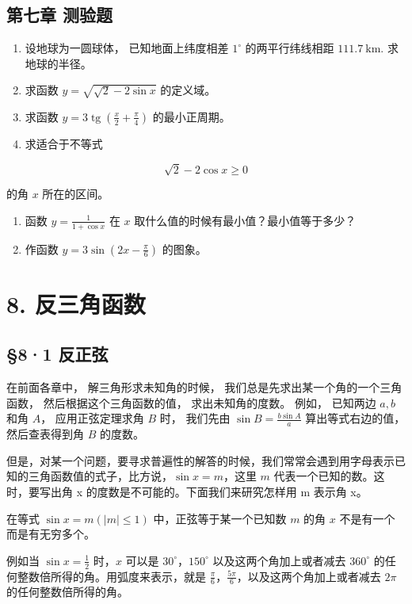 \section{第七章 测验题}

\begin{enumerate}
\item
  设地球为一圆球体， 已知地面上纬度相差 \(1^{\circ}\) 的两平行纬线相距
  \(111.7 \mathrm{~km}\). 求地球的半径。
\item
  求函数 \(y = \sqrt{\sqrt2-2\sin x}\) 的定义域。
\item
  求函数
  \(y = 3 \operatorname{tg} \left( \frac{x}{2} + \frac{\pi}{4} \right)\)
  的最小正周期。
\item
  求适合于不等式
\end{enumerate}

\[
\sqrt {2} - 2 \cos x \geqslant 0
\]

的角 \(x\) 所在的区间。

\begin{enumerate}[start=5]
\item
  函数 \(y = \frac{1}{1 + \cos x}\) 在 \(x\)
  取什么值的时候有最小值？最小值等于多少？
\item
  作函数 \(y = 3 \sin \left( 2x - \frac{\pi}{6} \right)\) 的图象。
\end{enumerate}

\chapter{8. 反三角函数}

\section{§8·1 反正弦}

在前面各章中， 解三角形求未知角的时候，
我们总是先求出某一个角的一个三角函数， 然后根据这个三角函数的值，
求出未知角的度数。 例如， 已知两边 \(a, b\) 和角 \(A\)，
应用正弦定理求角 \(B\) 时， 我们先由 \(\sin B = \frac{b \sin A}{a}\)
算出等式右边的值， 然后查表得到角 \(B\) 的度数。

但是，对某一个问题，要寻求普遍性的解答的时候，我们常常会遇到用字母表示已知的三角函数值的式子，比方说，\(\sin x = m\)，这里
\(m\) 代表一个已知的数。这时，要写出角 x
的度数是不可能的。下面我们来研究怎样用 m 表示角 x。

在等式 \(\sin x = m(|m| \leqslant 1)\) 中，正弦等于某一个已知数 \(m\)
的角 \(x\) 不是有一个而是有无穷多个。

例如当 \(\sin x = \frac{1}{2}\) 时，\(x\) 可以是
\(30^{\circ}\)，\(150^{\circ}\) 以及这两个角加上或者减去 \(360^{\circ}\)
的任何整数倍所得的角。用弧度来表示，就是
\(\frac{\pi}{6}\)，\(\frac{5\pi}{6}\)，以及这两个角加上或者减去 \(2\pi\)
的任何整数倍所得的角。


